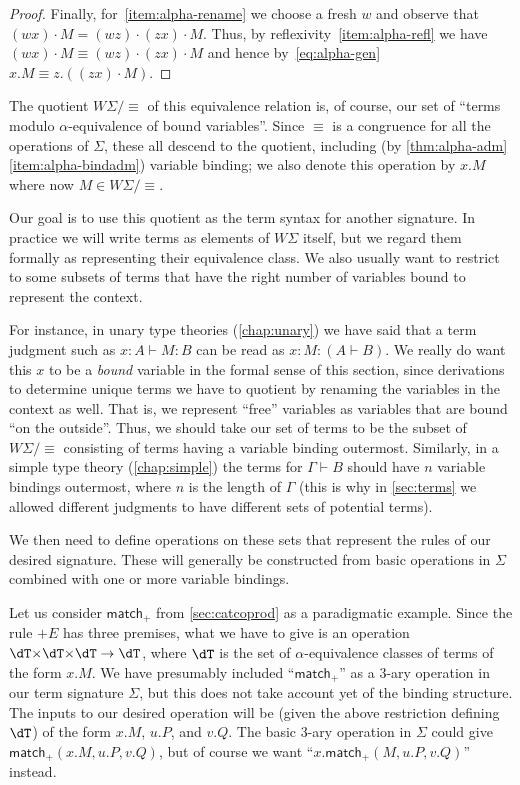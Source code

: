 \documentclass{book}
\def\sig{\Sigma}
\let\types\vdash
\def\plusE{\mathord{+}E}
\def\case{\mathsf{match}_+}
\begin{document}
\begin{proof}
  Finally, for~\ref{item:alpha-rename} we choose a fresh $w$ and observe that $(wx)\cdot M = (wz)\cdot (zx)\cdot M$.
  Thus, by reflexivity~\ref{item:alpha-refl} we have $(wx)\cdot M \equiv (wz)\cdot (zx)\cdot M$ and hence by~\eqref{eq:alpha-gen} $x.M \equiv z.((zx)\cdot M)$.
\end{proof}

The quotient $W\sig/\equiv$ of this equivalence relation is, of course, our set of ``terms modulo $\alpha$-equivalence of bound variables''.
Since $\equiv$ is a congruence for all the operations of $\sig$, these all descend to the quotient, including (by \cref{thm:alpha-adm}\ref{item:alpha-bindadm}) variable binding; we also denote this operation by $x.M$ where now $M\in W\sig/\equiv$.

Our goal is to use this quotient as the term syntax for another signature.
In practice we will write terms as elements of $W\sig$ itself, but we regard them formally as representing their equivalence class.
We also usually want to restrict to some subsets of terms that have the right number of variables bound to represent the context.

For instance, in unary type theories (\cref{chap:unary}) we have said that a term judgment such as $x:A\types M:B$ can be read as $x:M: (A\types B)$.
We really do want this $x$ to be a \emph{bound} variable in the formal sense of this section, since derivations to determine unique terms we have to quotient by renaming the variables in the context as well.
That is, we represent ``free'' variables as variables that are bound ``on the outside''.
Thus, we should take our set \dT of terms to be the subset of $W\sig/\equiv$ consisting of terms having a variable binding outermost.
Similarly, in a simple type theory (\cref{chap:simple}) the terms for $\Gamma\types B$ should have $n$ variable bindings outermost, where $n$ is the length of $\Gamma$ (this is why in \cref{sec:terms} we allowed different judgments to have different sets of potential terms).

We then need to define operations on these sets \dT that represent the rules of our desired signature.
These will generally be constructed from basic operations in $\sig$ combined with one or more variable bindings.

Let us consider $\case$ from \cref{sec:catcoprod} as a paradigmatic example.
Since the rule $\plusE$ has three premises, what we have to give is an operation $\dT\times \dT\times \dT \to \dT$, where $\dT$ is the set of $\alpha$-equivalence classes of terms of the form $x.M$.
We have presumably included ``$\case$'' as a 3-ary operation in our term signature $\sig$, but this does not take account yet of the binding structure.
The inputs to our desired operation will be (given the above restriction defining $\dT$) of the form $x.M$, $u.P$, and $v.Q$.
The basic 3-ary operation in $\sig$ could give $\case(x.M,u.P,v.Q)$, but of course we want ``$x.\case(M,u.P,v.Q)$'' instead.
\end{document}
